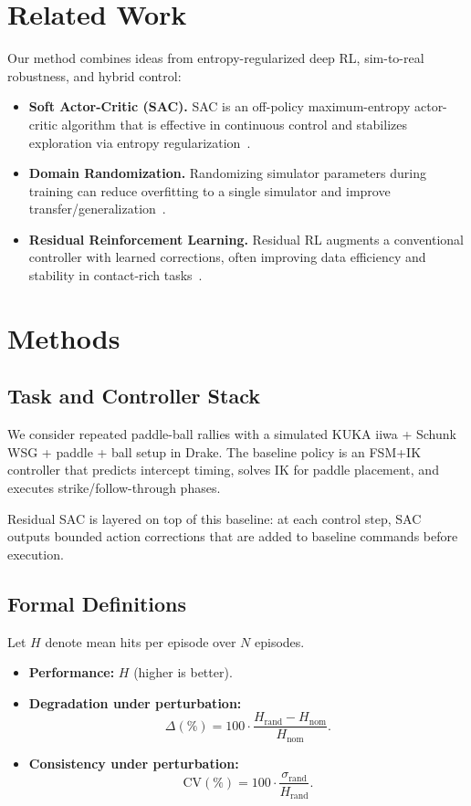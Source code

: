 \documentclass[10pt,twocolumn,letterpaper]{article}
\begin{document}
\section{Related Work}
Our method combines ideas from entropy-regularized deep RL, sim-to-real robustness, and hybrid control:
\begin{itemize}
    \item \textbf{Soft Actor-Critic (SAC).} SAC is an off-policy maximum-entropy actor-critic algorithm that is effective in continuous control and stabilizes exploration via entropy regularization~\cite{haarnoja2018sac}.
    \item \textbf{Domain Randomization.} Randomizing simulator parameters during training can reduce overfitting to a single simulator and improve transfer/generalization~\cite{tobin2017domainrand,peng2018sim2real}.
    \item \textbf{Residual Reinforcement Learning.} Residual RL augments a conventional controller with learned corrections, often improving data efficiency and stability in contact-rich tasks~\cite{johannink2019residualrl}.
\end{itemize}

\section{Methods}
\subsection{Task and Controller Stack}
We consider repeated paddle-ball rallies with a simulated KUKA iiwa + Schunk WSG + paddle + ball setup in Drake. The baseline policy is an FSM+IK controller that predicts intercept timing, solves IK for paddle placement, and executes strike/follow-through phases.

Residual SAC is layered on top of this baseline: at each control step, SAC outputs bounded action corrections that are added to baseline commands before execution.

\subsection{Formal Definitions}
Let \(H\) denote mean hits per episode over \(N\) episodes.
\begin{itemize}
    \item \textbf{Performance:} \(H\) (higher is better).
    \item \textbf{Degradation under perturbation:}
    \[
    \Delta(\%) = 100\cdot\frac{H_{\text{rand}} - H_{\text{nom}}}{H_{\text{nom}}}.
    \]
    \item \textbf{Consistency under perturbation:}
    \[
    \mathrm{CV}(\%) = 100\cdot \frac{\sigma_{\text{rand}}}{H_{\text{rand}}}.
    \]
\end{itemize}
\end{document}
